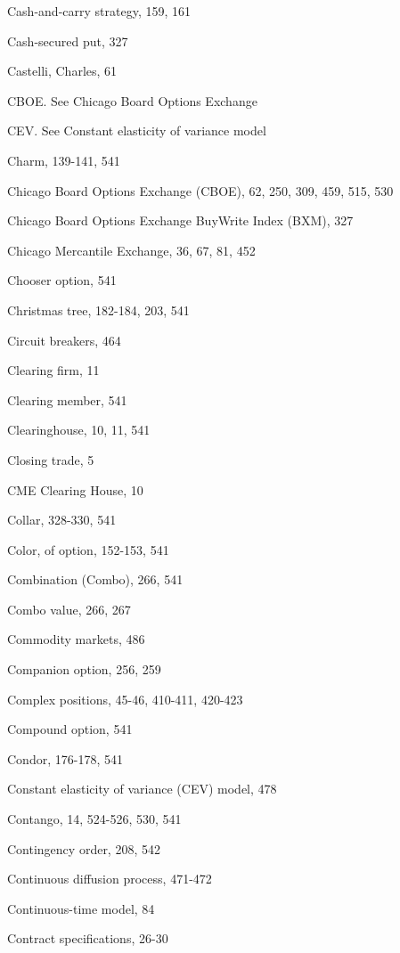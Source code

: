 \noindent Cash-and-carry strategy, 159, 161\par
\noindent Cash-secured put, 327\par
\noindent Castelli, Charles, 61\par
\noindent CBOE. See Chicago Board Options Exchange\par
\noindent CEV. See Constant elasticity of variance model\par
\noindent Charm, 139-141, 541\par
Chicago Board Options Exchange (CBOE), 62, 250, 309, 459, 515, 530\par
Chicago Board Options Exchange BuyWrite Index (BXM), 327\par
\noindent Chicago Mercantile Exchange, 36, 67, 81, 452\par
\noindent Chooser option, 541\par
\noindent Christmas tree, 182-184, 203, 541\par
\noindent Circuit breakers, 464\par
\noindent Clearing firm, 11\par
\noindent Clearing member, 541\par
\noindent Clearinghouse, 10, 11, 541\par
\noindent Closing trade, 5\par
\noindent CME Clearing House, 10\par
\noindent Collar, 328-330, 541\par
\noindent Color, of option, 152-153, 541\par
\noindent Combination (Combo), 266, 541\par
\noindent Combo value, 266, 267\par
\noindent Commodity markets, 486\par
\noindent Companion option, 256, 259\par
\noindent Complex positions, 45-46, 410-411, 420-423\par
\noindent Compound option, 541\par
\noindent Condor, 176-178, 541\par
\noindent Constant elasticity of variance (CEV) model, 478\par
\noindent Contango, 14, 524-526, 530, 541\par
\noindent Contingency order, 208, 542\par
\noindent Continuous diffusion process, 471-472\par
\noindent Continuous-time model, 84\par
\noindent Contract specifications, 26-30\par

